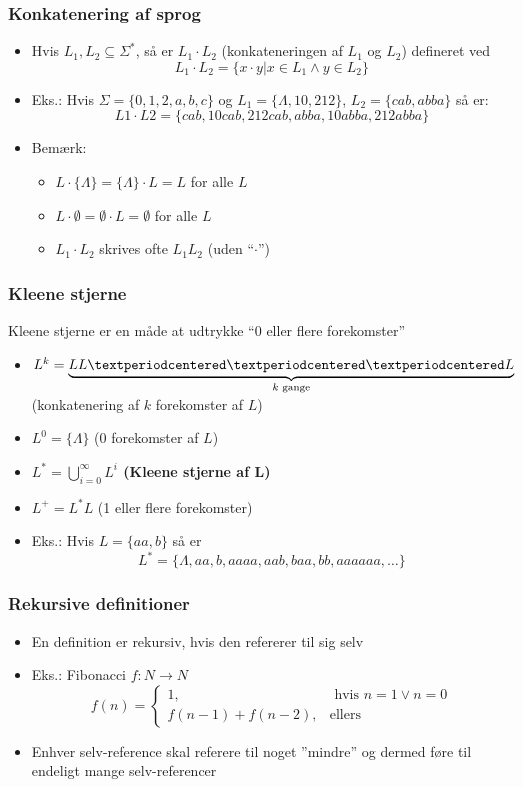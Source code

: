 \documentclass[]{beamer}
\newcommand{\explain}[2]{\underset{\mathclap{#2}}{\underbrace{#1}}}
\begin{document}
\begin{frame}
\frametitle{Konkatenering af sprog}
\begin{itemize}
\item Hvis $L_1,L_2⊆Σ^*$, så er $L_1·L_2$  (konkateneringen af 
$L_1$ og $L_2$) defineret ved
	 \[L_1·L_2 = \{x·y | x∈L_1 ∧ y∈L_2\}\]

\item Eks.: Hvis $Σ=\{0,1,2,a,b,c\}$ og
$L_1=\{Λ,10,212\}$, 
$L_2=\{cab,abba\}$ så er: 
\[L1·L2 =\{cab,10cab,212cab,abba,10abba,212abba\}\]
\item Bemærk:
\begin{itemize}
\item $L·\{Λ\} = \{Λ\}·L = L$  for alle $L$
\item $L·∅ = ∅·L = ∅$  for alle $L$
\item $L_1·L_2$ skrives ofte $L_1L_2$ (uden “$·$”)
\end{itemize}
\end{itemize}
\end{frame}

\begin{frame}
\frametitle{Kleene stjerne}
Kleene stjerne er en måde at udtrykke ``0 eller flere forekomster''
\begin{itemize}
\item $L^k = \explain{LL···L}{\text{$k$ gange}}$
	   (konkatenering af $k$ forekomster af $L$)
\item $L^0 = \{Λ\}$ (0 forekomster af $L$)
\item \textbf{$L^* = \bigcup_{i=0}^∞{L^i}$ (Kleene stjerne af L)}
\item $L^+ = L^*L$ (1 eller flere forekomster)
\item Eks.: Hvis $L=\{aa,b\}$ så er
\[L^*=\{Λ,aa,b,aaaa, aab, baa, bb, aaaaaa, … \}\]
\end{itemize}
\end{frame}

\begin{frame}
\frametitle{Rekursive definitioner}

\begin{itemize}
\item En definition er rekursiv, hvis den
refererer til sig selv

\item Eks.:   Fibonacci $f : N→N$
	\[f(n) = \begin{cases}
                     1,& \text{ hvis } n=1 ∨ n=0 \\
                     f(n-1)+f(n-2), & \text{ellers}
                 \end{cases} \]

\item Enhver selv-reference skal referere til noget ”mindre” og dermed
  føre til endeligt mange selv-referencer
\end{itemize}
\end{frame}
\end{document}
